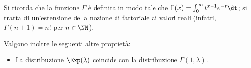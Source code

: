 \begin{landscape}
    Si ricorda che la funzione $\Gamma$ è definita in modo tale che $\Gamma(x) = \int_0^\infty t^{x-1} e^{-t} \dt$; si tratta
    di un'estensione della nozione di fattoriale ai valori reali (infatti, $\Gamma(n+1) = n!$ per $n \in \NN$). \smallskip
    
    Valgono inoltre le seguenti altre proprietà:
    
    \small
    \begin{itemize}
        \item La distribuzione $\Exp(\lambda)$ coincide con la distribuzione $\Gamma(1, \lambda)$.
    \end{itemize}
    
    \end{landscape}